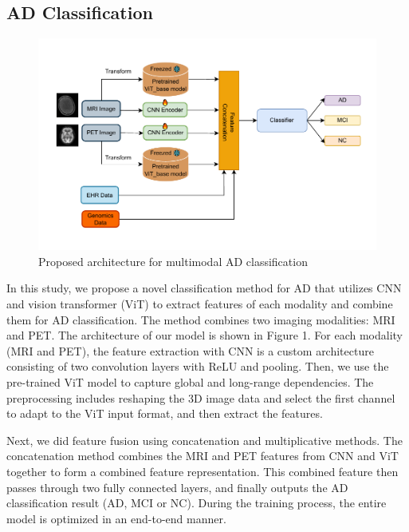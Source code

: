 \subsection{AD Classification}
\begin{figure}
    \centering
    \includegraphics[width=0.75\linewidth]{figs/arch-classification_new.pdf}
    
    \caption{Proposed architecture for multimodal AD classification}
    \vspace{-2mm}
    \label{fig:enter-label}
\end{figure}
In this study, we propose a novel classification method for AD that utilizes CNN and vision transformer (ViT\cite{dosovitskiy_image_2021}) to extract features of each modality and combine them for AD classification. The method combines two imaging modalities: MRI and PET. The architecture of our model is shown in Figure 1. For each modality (MRI and PET), the feature extraction with CNN is a custom architecture consisting of two convolution layers with ReLU and pooling. Then, we use the pre-trained ViT model to capture global and long-range dependencies. The preprocessing includes reshaping the 3D image data and select the first channel to adapt to the ViT input format, and then extract the features. 

Next, we did feature fusion using concatenation and multiplicative methods. The concatenation method combines the MRI and PET features from CNN and ViT together to form a combined feature representation. This combined feature then passes through two fully connected layers, and finally outputs the AD classification result (AD, MCI or NC). During the training process, the entire model is optimized in an end-to-end manner. 

